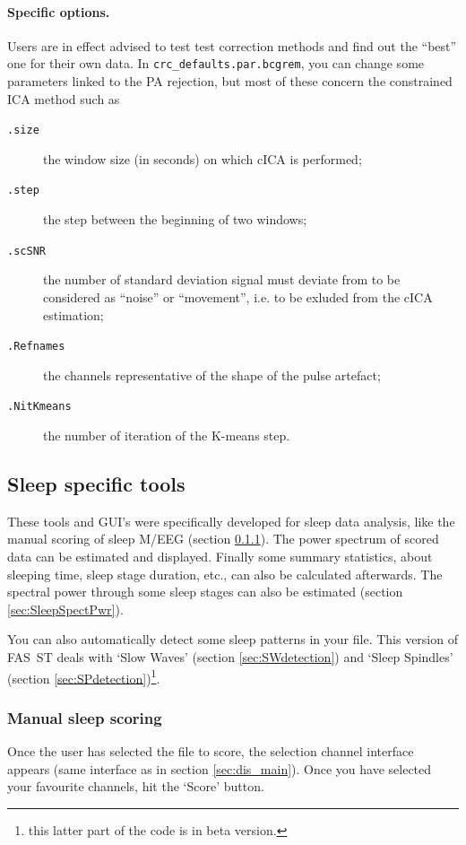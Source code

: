 \documentclass[a4paper,titlepage]{article}
\def\dblS{\hbox{S\hskip -4.5pt S}}
\newcommand{\fasst}{FA\dblS T } 	%
\begin{document}
\paragraph{Specific options.}
Users are in effect advised to test test correction methods and find out the ``best'' one for their own data. 
In {\tt crc\_defaults.par.bcgrem}, you can change some parameters linked to the PA rejection, but most of these concern the constrained ICA method such as
\begin{description}
\item[\tt .size] the window size (in seconds) on which cICA is performed;
\item[\tt .step] the step between the beginning of two windows;
\item[\tt .scSNR] the number of standard deviation signal must deviate from to be considered as ``noise'' or ``movement'', i.e. to be exluded from the cICA estimation;
\item[\tt .Refnames] the channels representative of the shape of the pulse artefact;
\item[\tt .NitKmeans] the number of iteration of the K-means step.
\end{description}

\subsection{Sleep specific tools}
\label{sec:Sleeptools}

These tools and GUI's were specifically developed for sleep data analysis, like the manual scoring of sleep M/EEG (section \ref{sec:Sleepscoring}). The power spectrum of scored data can be estimated and displayed. Finally some summary statistics, about sleeping time, sleep stage duration, etc., can also be calculated afterwards. The spectral power through some sleep stages can also be estimated (section \ref{sec:SleepSpectPwr}).

You can also automatically detect some sleep patterns in your file. This version of \fasst deals with `Slow Waves' (section \ref{sec:SWdetection}) and `Sleep Spindles' (section \ref{sec:SPdetection})\footnote{this latter part of the code is in beta version.}.

\subsubsection{Manual sleep scoring}
\label{sec:Sleepscoring}
Once the user has selected the file to score, the selection channel interface appears (same interface as in section \ref{sec:dis_main}). Once you have selected your favourite channels, hit the `Score' button.
\end{document}
